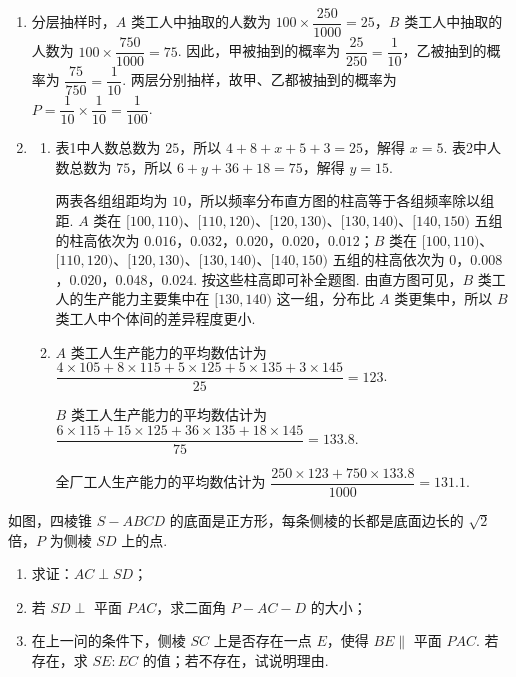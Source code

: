 \begin{solution}
\begin{enumerate}
\item 分层抽样时，\(A\) 类工人中抽取的人数为 \(100\times\dfrac{250}{1000}=25\)，\(B\) 类工人中抽取的人数为 \(100\times\dfrac{750}{1000}=75\). 因此，甲被抽到的概率为 \(\dfrac{25}{250}=\dfrac{1}{10}\)，乙被抽到的概率为 \(\dfrac{75}{750}=\dfrac{1}{10}\). 两层分别抽样，故甲、乙都被抽到的概率为
\(P=\dfrac{1}{10}\times\dfrac{1}{10}=\dfrac{1}{100}\).
\item
\begin{enumerate}
\item 表1中人数总数为 \(25\)，所以 \(4+8+x+5+3=25\)，解得 \(x=5\). 表2中人数总数为 \(75\)，所以 \(6+y+36+18=75\)，解得 \(y=15\).

两表各组组距均为 \(10\)，所以频率分布直方图的柱高等于各组频率除以组距. \(A\) 类在 \([100,110)\)、\([110,120)\)、\([120,130)\)、\([130,140)\)、\([140,150)\) 五组的柱高依次为
\(0.016\)，\(0.032\)，\(0.020\)，\(0.020\)，\(0.012\)；\(B\) 类在 \([100,110)\)、\([110,120)\)、\([120,130)\)、\([130,140)\)、\([140,150)\) 五组的柱高依次为
\(0\)，\(0.008\)，\(0.020\)，\(0.048\)，\(0.024\). 按这些柱高即可补全题图. 由直方图可见，\(B\) 类工人的生产能力主要集中在 \([130,140)\) 这一组，分布比 \(A\) 类更集中，所以 \(B\) 类工人中个体间的差异程度更小.
\item \(A\) 类工人生产能力的平均数估计为
\(\dfrac{4\times105+8\times115+5\times125+5\times135+3\times145}{25}=123\).

\(B\) 类工人生产能力的平均数估计为
\(\dfrac{6\times115+15\times125+36\times135+18\times145}{75}=133.8\).

全厂工人生产能力的平均数估计为
\(\dfrac{250\times123+750\times133.8}{1000}=131.1\).
\end{enumerate}
\end{enumerate}
\end{solution}

\begin{problem}
如图，四棱锥 \(S - ABCD\) 的底面是正方形，每条侧棱的长都是底面边长的 \(\sqrt{2}\) 倍，\(P\) 为侧棱 \(SD\) 上的点.

\begin{enumerate}
\item 求证：\(AC \perp SD\)；
\item 若 \(SD \perp\) 平面 \(PAC\)，求二面角 \(P - AC - D\) 的大小；
\item 在上一问的条件下，侧棱 \(SC\) 上是否存在一点 \(E\)，使得 \(BE \parallel\) 平面 \(PAC\). 若存在，求 \(SE:EC\) 的值；若不存在，试说明理由.
\end{enumerate}

\end{problem}

